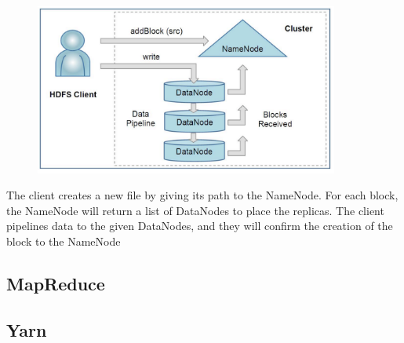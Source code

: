 \begin{figure}[H]
	\includegraphics[width=100mm, keepaspectratio]{figures/hdfs_client.png}
	\centering
\end{figure}
The client creates a new file by giving its path to the NameNode. For each block, the NameNode will return a list of DataNodes to place the replicas. The client pipelines data to the given DataNodes, and they will confirm the creation of the block to the NameNode
\subsection{MapReduce}
\subsection{Yarn}